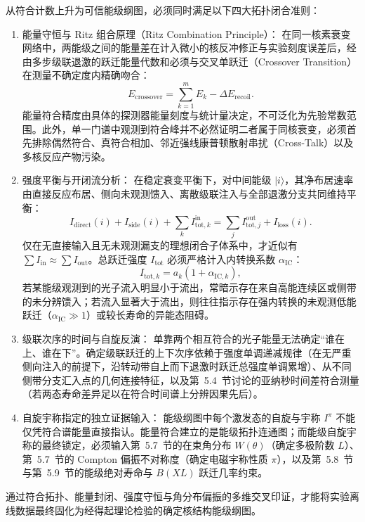 从符合计数上升为可信能级纲图，必须同时满足以下四大拓扑闭合准则：
\begin{enumerate}
\item 能量守恒与 Ritz 组合原理（Ritz Combination Principle）：
在同一核素衰变网络中，两能级之间的能量差在计入微小的核反冲修正与实验刻度误差后，经由多步级联退激的跃迁能量代数和必须与交叉单跃迁（Crossover Transition）在测量不确定度内精确吻合：
\begin{equation}\label{eq:5-6-ritz-combination}
E_{\mathrm{crossover}} = \sum_{k=1}^m E_k - \Delta E_{\mathrm{recoil}}.
\end{equation}
能量符合精度由具体的探测器能量刻度与统计量决定，不可泛化为先验常数范围。此外，单一门谱中观测到符合峰并不必然证明二者属于同核衰变，必须首先排除偶然符合、真符合相加、邻近强线康普顿散射串扰（Cross-Talk）以及多核反应产物污染。
\item 强度平衡与开闭流分析：
在稳定衰变平衡下，对中间能级 $|i\rangle$，其净布居速率由直接反应布居、侧向未观测馈入、离散级联注入与全部退激分支共同维持平衡：
\begin{equation}\label{eq:5-6-intensity-balance}
I_{\mathrm{direct}}(i) + I_{\mathrm{side}}(i) + \sum_{k} I_{\mathrm{tot}, k}^{\mathrm{in}} = \sum_{j} I_{\mathrm{tot}, j}^{\mathrm{out}} + I_{\mathrm{loss}}(i).
\end{equation}
仅在无直接输入且无未观测漏支的理想闭合子体系中，才近似有 $\sum I_{\mathrm{in}} \approx \sum I_{\mathrm{out}}$。总跃迁强度 $I_{\mathrm{tot}}$ 必须严格计入内转换系数 $\alpha_{\mathrm{IC}}$：
\begin{equation}\label{eq:5-6-itot-expansion}
I_{\mathrm{tot}, k} = a_k (1 + \alpha_{\mathrm{IC}, k}),
\end{equation}
若某能级观测到的光子流入明显小于流出，常暗示存在来自高能连续区或侧带的未分辨馈入；若流入显著大于流出，则往往指示存在强内转换的未观测低能跃迁（$\alpha_{\mathrm{IC}} \gg 1$）或较长寿命的异能态阻碍。
\item 级联次序的时间与自旋反演：
单靠两个相互符合的光子能量无法确定“谁在上、谁在下”。确定级联跃迁的上下次序依赖于强度单调递减规律（在无严重侧向注入的前提下，沿转动带自上而下退激时跃迁总强度单调累增）、从不同侧带分支汇入点的几何连接特征，以及第~5.4~节讨论的亚纳秒时间差符合测量（若两态寿命差异足以在符合时间谱上分辨因果先后）。
\item 自旋宇称指定的独立证据输入：
能级纲图中每个激发态的自旋与宇称 $I^\pi$ 不能仅凭符合谱能量直接指认。能量符合建立的是能级拓扑连通图；而能级自旋宇称的最终锁定，必须输入第~5.7~节的在束角分布 $W(\theta)$（确定多极阶数 $L$）、第~5.7~节的 Compton 偏振不对称度（确定电磁宇称性质 $\pi$），以及第~5.8~节与第~5.9~节的能级绝对寿命与 $B(XL)$ 跃迁几率约束。
\end{enumerate}
通过符合拓扑、能量封闭、强度守恒与角分布偏振的多维交叉印证，才能将实验离线数据最终固化为经得起理论检验的确定核结构能级纲图。
